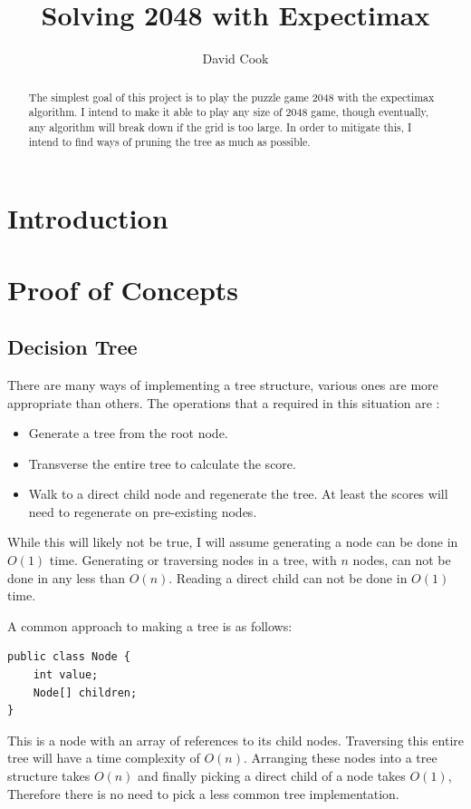 \documentclass{article}
\title{Solving 2048 with Expectimax}
\author{David Cook}
\begin{document}
\maketitle

\tableofcontents

\begin{abstract}
The simplest goal of this project is to play the puzzle game 2048 with the expectimax algorithm. I intend to make it able to play any size of 2048 game, though eventually, any algorithm will break down if the grid is too large. In order to mitigate this, I intend to find ways of pruning the tree as much as possible. 
\end{abstract}
\section{Introduction}
\label{sec:intro}
\section{Proof of Concepts}
\label{sec:proof_of_concepts}
\subsection{Decision Tree}
\label{subsec:dt}
There are many ways of implementing a tree structure, various ones are more appropriate than others. The operations that a required in this situation are \cite{russell2010artificial}:
\begin{itemize}
    \item Generate a tree from the root node.
    \item Transverse the entire tree to calculate the score.
    \item Walk to a direct child node and regenerate the tree. At least the scores will need to regenerate on pre-existing nodes.
\end{itemize}
While this will likely not be true, I will assume generating a node can be done in $O(1)$ time. Generating or traversing nodes in a tree, with $n$ nodes, can not be done in any less than $O(n)$. Reading a direct child can not be done in $O(1)$ time. \par
A common approach to making a tree is as follows:
\begin{verbatim}
public class Node {
    int value;
    Node[] children;
}
\end{verbatim}
This is a node with an array of references to its child nodes. Traversing this entire tree will have a time complexity of $O(n)$. Arranging these nodes into a tree structure takes $O(n)$ and finally picking a direct child of a node takes $O(1)$, Therefore there is no need to pick a less common tree implementation.
\end{document}
